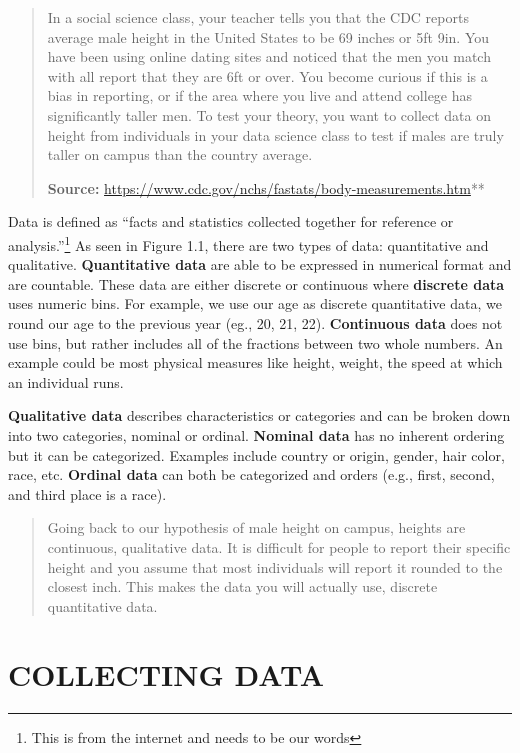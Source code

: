 \documentclass[
]{book}
\begin{document}
\begin{quote}
In a social science class, your teacher tells you that the CDC
reports average male height in the United States to be 69
inches or 5ft 9in. You have been using online dating sites and
noticed that the men you match with all report that they are
6ft or over. You become curious if this is a bias in reporting,
or if the area where you live and attend college has
significantly taller men. To test your theory, you want to
collect data on height from individuals in your data science
class to test if males are truly taller on campus than the
country average.

\textbf{Source:} \url{https://www.cdc.gov/nchs/fastats/body-measurements.htm}**
\end{quote}

Data is defined as ``facts and statistics collected together for
reference or analysis.''\footnote{This is from the internet and needs to
  be our words} As seen in Figure 1.1, there are two types of data:
quantitative and qualitative. \textbf{Quantitative data} are able to
be expressed in numerical format and are countable. These data
are either discrete or continuous where \textbf{discrete data} uses
numeric bins. For example, we use our age as discrete
quantitative data, we round our age to the previous year (eg.,
20, 21, 22). \textbf{Continuous data} does not use bins, but rather
includes all of the fractions between two whole numbers. An
example could be most physical measures like height, weight, the
speed at which an individual runs.

\textbf{Qualitative data} describes characteristics or categories and
can be broken down into two categories, nominal or ordinal.
\textbf{Nominal data} has no inherent ordering but it can be
categorized. Examples include country or origin, gender, hair
color, race, etc. \textbf{Ordinal data} can both be categorized and
orders (e.g., first, second, and third place is a race).

\begin{quote}
Going back to our hypothesis of male height on campus, heights
are continuous, qualitative data. It is difficult for people to
report their specific height and you assume that most
individuals will report it rounded to the closest inch. This
makes the data you will actually use, discrete quantitative
data.
\end{quote}

\hypertarget{collecting-data}{%
\section{COLLECTING DATA}\label{collecting-data}}
\end{document}
